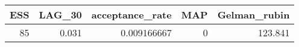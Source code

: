 \begin{longtable}{rrrrr}
\toprule
ESS & LAG\_30 & acceptance\_rate & MAP & Gelman\_rubin \\ 
\midrule
85 & 0.031 & 0.009166667 & 0 & 123.841 \\ 
\bottomrule
\end{longtable}

